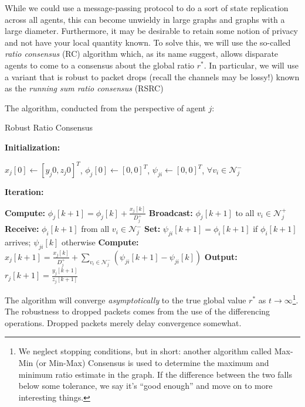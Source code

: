 \documentclass[11pt]{article}
\begin{document}
While we could use a message-passing protocol to do a sort of state replication
across all agents, this can become unwieldy in large graphs and graphs with a
large diameter. Furthermore, it may be desirable to retain some notion of
privacy and not have your local quantity known. To solve this, we will use the
so-called \textit{ratio consensus} (RC) algorithm which, as its name suggest, allows
disparate agents to come to a consensus about the global ratio $r^*$. In
particular, we will use a variant that is robust to packet drops (recall the
channels may be lossy!) known as the \textit{running sum ratio consensus} (RSRC)

The algorithm, conducted from the perspective of agent $j$:
\begin{algorithm}
    \caption{Robust Ratio Consensus}
    \textbf{Initialization:}
    \begin{algorithmic}
        \State $x_j[0] \gets [y_j0, z_j0]^T$, $\phi_j[0]\gets[0,0]^T$,
        $\psi_{ji}\gets[0,0]^T$, $\forall v_i\in\mathcal{N}_j^-$
    \end{algorithmic}
    \textbf{Iteration:}
    \begin{algorithmic}
        \State \textbf{Compute:} $\phi_j[k+1] = \phi_j[k] + \frac{x_j[k]}{D_j^+}$
        \State \textbf{Broadcast:} $\phi_j[k+1]$ to all $v_i\in\mathcal{N}_j^+$
        \State \textbf{Receive:} $\phi_i[k+1]$ from all $v_i\in\mathcal{N}_j^-$
        \State \textbf{Set:} $\psi_{ji}[k+1] = \phi_i[k+1]$ if $\phi_i[k+1]$ arrives; $\psi_{ji}[k]$ otherwise
        \State \textbf{Compute:} $x_j[k+1] = \frac{x_j[k]}{D_j^+} + \sum_{v_i\in\mathcal{N}_j^-}\left(\psi_{ji}[k+1]-\psi_{ji}[k]\right)$
        \State \textbf{Output:} $r_j[k+1] = \frac{y_j[k+1]}{z_j[k+1]}$
        \EndFor
    \end{algorithmic}
\end{algorithm}

The algorithm will converge \textit{asymptotically} to the true global value
$r^*$ as $t\rightarrow\infty$\footnote{We neglect stopping conditions, but in
    short: another algorithm called Max-Min (or Min-Max) Consensus is used to
    determine the maximum and minimum ratio estimate in the graph. If the difference
    between the two falls below some tolerance, we say it's ``good enough'' and move
    on to more interesting things.}.
The robustness to dropped packets comes from the use of the differencing operations. Dropped packets
merely delay convergence somewhat.
\end{document}
